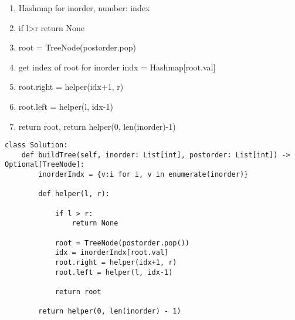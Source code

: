 \documentclass{assignmeownt}
\begin{document}
\begin{enumerate}
    \item Hashmap for inorder, number: index
    \item if l>r return None
    \item root = TreeNode(postorder.pop)
    \item get index of root for inorder indx = Hashmap[root.val]
    \item root.right = helper(idx+1, r)
    \item root.left = helper(l, idx-1)
    \item return root, return helper(0, len(inorder)-1)
\end{enumerate}


\begin{lstlisting}[caption=construct binary tree]
    class Solution:
    def buildTree(self, inorder: List[int], postorder: List[int]) -> Optional[TreeNode]:
        inorderIndx = {v:i for i, v in enumerate(inorder)}
        
        def helper(l, r):

            if l > r:
                return None

            root = TreeNode(postorder.pop())
            idx = inorderIndx[root.val]
            root.right = helper(idx+1, r)
            root.left = helper(l, idx-1)

            return root
        
        return helper(0, len(inorder) - 1)


            
\end{lstlisting}
\end{document}
